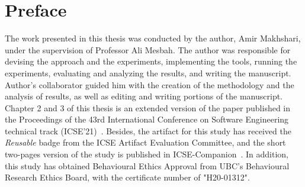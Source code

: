 
\chapter{Preface}

The work presented in this thesis was conducted by the author, Amir Makhshari, under the supervision of Professor Ali Mesbah. The author was responsible for devising the approach and the experiments, implementing the tools, running the experiments, evaluating and analyzing the results, and writing the manuscript. Author's collaborator guided him with the creation of the methodology and the analysis of results, as well as editing and writing portions of the manuscript. Chapter 2 and 3 of this thesis is an extended version of the paper published in the Proceedings of the 43rd International Conference on Software Engineering technical track (ICSE'21)~\cite{makhshari2021iot}. Besides, the artifact for this study has received the \textit{Reusable} badge from the ICSE Artifact Evaluation Committee, and the short two-pages version of the study is published in ICSE-Companion~\cite{makhshari2021iotCompanion}. In addition, this study has obtained Behavioural Ethics Approval from UBC's Behavioural Research Ethics Board, with the certificate number of "H20-01312".
